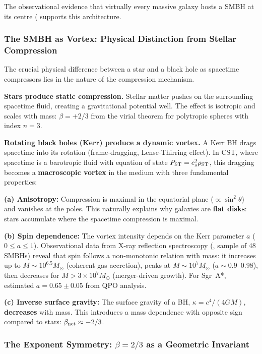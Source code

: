 \documentclass[11pt,a4paper]{article}
\begin{document}
The observational evidence that virtually every massive galaxy hosts a SMBH at its centre (\cite{Kormendy2013} supports this architecture.

\subsubsection{The SMBH as Vortex: Physical Distinction from Stellar Compression}

The crucial physical difference between a star and a black hole as spacetime compressors lies in the nature of the compression mechanism.

\textbf{Stars produce static compression.} Stellar matter pushes on the surrounding spacetime fluid, creating a gravitational potential well. The effect is isotropic and scales with mass: $\beta = +2/3$ from the virial theorem for polytropic spheres with index $n = 3$.

\textbf{Rotating black holes (Kerr) produce a dynamic vortex.} A Kerr BH drags spacetime into its rotation (frame-dragging, Lense-Thirring effect). In CST, where spacetime is a barotropic fluid with equation of state $P_{\rm ST} = c_s^2 \rho_{\rm ST}$, this dragging becomes a \textbf{macroscopic vortex} in the medium with three fundamental properties:

\textbf{(a) Anisotropy:} Compression is maximal in the equatorial plane ($\propto \sin^2\theta$) and vanishes at the poles. This naturally explains why galaxies are \textbf{flat disks}: stars accumulate where the spacetime compression is maximal.

\textbf{(b) Spin dependence:} The vortex intensity depends on the Kerr parameter $a$ ($0 \leq a \leq 1$). Observational data from X-ray reflection spectroscopy (\cite{Chen2025}, sample of 48 SMBHs) reveal that spin follows a non-monotonic relation with mass: it increases up to $M \sim 10^{6.5} M_\odot$ (coherent gas accretion), peaks at $M \sim 10^7 M_\odot$ ($a \sim 0.9$--0.98), then decreases for $M > 3 \times 10^7 M_\odot$ (merger-driven growth). For Sgr~A*, \cite{Dokuchaev2013} estimated $a = 0.65 \pm 0.05$ from QPO analysis.

\textbf{(c) Inverse surface gravity:} The surface gravity of a BH, $\kappa = c^4/(4GM)$, \textbf{decreases} with mass. This introduces a mass dependence with opposite sign compared to stars: $\beta_{\rm net} \approx -2/3$.

\subsubsection{The Exponent Symmetry: $\beta = 2/3$ as a Geometric Invariant}\label{sec:beta23}
\end{document}
